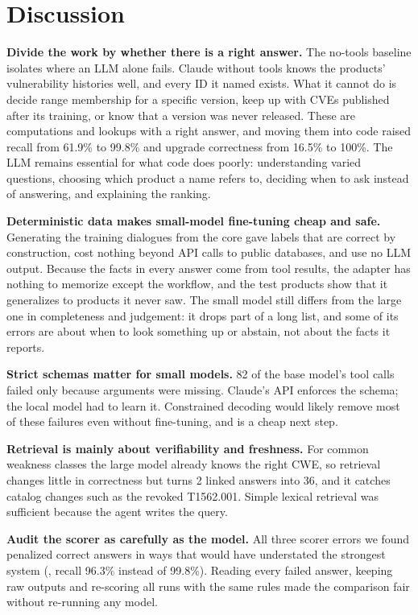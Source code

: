 \documentclass[final]{cvpr}
\begin{document}
\section{Discussion}
\label{sec:discussion}

\textbf{Divide the work by whether there is a right answer.} The no-tools baseline isolates where an LLM alone fails. Claude without tools knows the products' vulnerability histories well, and every ID it named exists. What it cannot do is decide range membership for a specific version, keep up with CVEs published after its training, or know that a version was never released. These are computations and lookups with a right answer, and moving them into code raised recall from 61.9\% to 99.8\% and upgrade correctness from 16.5\% to 100\%. The LLM remains essential for what code does poorly: understanding varied questions, choosing which product a name refers to, deciding when to ask instead of answering, and explaining the ranking.

\textbf{Deterministic data makes small-model fine-tuning cheap and safe.} Generating the training dialogues from the core gave labels that are correct by construction, cost nothing beyond API calls to public databases, and use no LLM output. Because the facts in every answer come from tool results, the adapter has nothing to memorize except the workflow, and the test products show that it generalizes to products it never saw. The small model still differs from the large one in completeness and judgement: it drops part of a long list, and some of its errors are about when to look something up or abstain, not about the facts it reports.

\textbf{Strict schemas matter for small models.} 82 of the base model's tool calls failed only because arguments were missing. Claude's API enforces the schema; the local model had to learn it. Constrained decoding would likely remove most of these failures even without fine-tuning, and is a cheap next step.

\textbf{Retrieval is mainly about verifiability and freshness.} For common weakness classes the large model already knows the right CWE, so retrieval changes little in correctness but turns 2 linked answers into 36, and it catches catalog changes such as the revoked T1562.001. Simple lexical retrieval was sufficient because the agent writes the query.

\textbf{Audit the scorer as carefully as the model.} All three scorer errors we found penalized correct answers in ways that would have understated the strongest system (\eg, recall 96.3\% instead of 99.8\%). Reading every failed answer, keeping raw outputs and re-scoring all runs with the same rules made the comparison fair without re-running any model.
\end{document}
